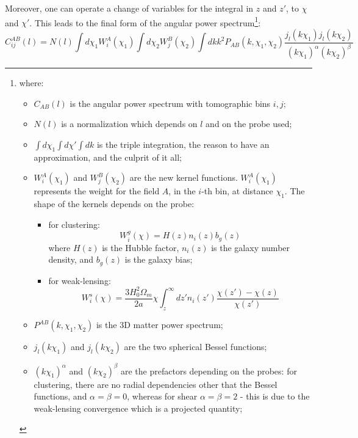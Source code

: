 Moreover, one can operate a change of variables for the integral in $z$ and $z'$, to $\chi$ and $\chi'$. This leads to the final form of the angular power spectrum\footnote{
where:
\begin{itemize}
    \item $C_{AB}(l)$ is the angular power spectrum with tomographic bins $i,j$;
    \item $N(l)$ is a normalization which depends on $l$ and on the probe used;
    \item $\int d\chi_1 \int d\chi' \int dk$ is the triple integration, the reason to have an approximation, and the culprit of it all;
    \item $W_i^A(\chi_1)$ and $W_j^B(\chi_2)$ are the new kernel functions. $W_i^A(\chi_1)$ represents the weight for the field $A$, in the $i$-th bin, at distance $\chi_1$. The shape of the kernels depends on the probe:
    \begin{itemize}
        \item for clustering: \begin{equation}
                                W_i^g(\chi) = H(z)n_i(z)b_g(z)
                                \label{kernel_cl}
                              \end{equation}
        where $H(z)$ is the Hubble factor, $n_i(z)$ is the galaxy number density, and $b_g(z)$ is the galaxy bias;
        \item for weak-lensing: \begin{equation}
                                W_i^s(\chi) = \frac{3H_0^2\Omega_m}{2a}\chi\int_{z}^{\infty}dz'n_i(z')\frac{\chi(z')-\chi(z)}{\chi(z')}
                                \label{kernel_sh}
                              \end{equation}
    \end{itemize}
    \item $P^{AB}(k, \chi_1, \chi_2)$ is the 3D matter power spectrum;
    \item $j_l(k\chi_1)$ and $j_l(k\chi_2)$ are the two spherical Bessel functions;
    \item $(k\chi_1)^\alpha$ and $(k\chi_2)^\beta$ are the prefactors depending on the probes: for clustering, there are no radial dependencies other that the Bessel functions, and $\alpha = \beta = 0$, whereas for shear $\alpha = \beta = 2$ - this is due to the weak-lensing convergence which is a projected quantity;
    \end{itemize}
}:
\begin{equation}
    C_{ij}^{AB}(l) = N(l) \int d\chi_1 W_i^A(\chi_1) \int d\chi_2 W_j^B(\chi_2) \int dk k^2 P_{AB}(k,\chi_1,\chi_2) \frac{j_l(k\chi_1) j_l(k\chi_2)}{(k\chi_1)^\alpha(k\chi_2)^\beta}
\label{eq8_blast}
\end{equation}
